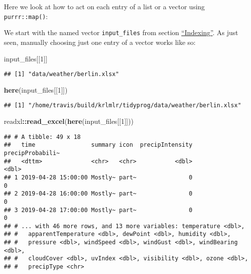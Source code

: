 \documentclass[]{book}
\newenvironment{Shaded}{\begin{snugshade}}{\end{snugshade}}
\newcommand{\DecValTok}[1]{\textcolor[rgb]{0.00,0.00,0.81}{#1}}
\newcommand{\KeywordTok}[1]{\textcolor[rgb]{0.13,0.29,0.53}{\textbf{#1}}}
\newcommand{\NormalTok}[1]{#1}
\newcommand{\OperatorTok}[1]{\textcolor[rgb]{0.81,0.36,0.00}{\textbf{#1}}}
\begin{document}
Here we look at how to act on each entry of a list or a vector using \texttt{purrr::map()}:

We start with the named vector \texttt{input\_files} from section \protect\hyperlink{indexing}{``Indexing''}.
As just seen, manually choosing just one entry of a vector works like so:

\begin{Shaded}
\begin{Highlighting}[]
\NormalTok{input_files[[}\DecValTok{1}\NormalTok{]]}
\end{Highlighting}
\end{Shaded}

\begin{verbatim}
## [1] "data/weather/berlin.xlsx"
\end{verbatim}

\begin{Shaded}
\begin{Highlighting}[]
\KeywordTok{here}\NormalTok{(input_files[[}\DecValTok{1}\NormalTok{]])}
\end{Highlighting}
\end{Shaded}

\begin{verbatim}
## [1] "/home/travis/build/krlmlr/tidyprog/data/weather/berlin.xlsx"
\end{verbatim}

\begin{Shaded}
\begin{Highlighting}[]
\NormalTok{readxl}\OperatorTok{::}\KeywordTok{read_excel}\NormalTok{(}\KeywordTok{here}\NormalTok{(input_files[[}\DecValTok{1}\NormalTok{]]))}
\end{Highlighting}
\end{Shaded}

\begin{verbatim}
## # A tibble: 49 x 18
##   time                summary icon  precipIntensity precipProbabili~
##   <dttm>              <chr>   <chr>           <dbl>            <dbl>
## 1 2019-04-28 15:00:00 Mostly~ part~               0                0
## 2 2019-04-28 16:00:00 Mostly~ part~               0                0
## 3 2019-04-28 17:00:00 Mostly~ part~               0                0
## # ... with 46 more rows, and 13 more variables: temperature <dbl>,
## #   apparentTemperature <dbl>, dewPoint <dbl>, humidity <dbl>,
## #   pressure <dbl>, windSpeed <dbl>, windGust <dbl>, windBearing <dbl>,
## #   cloudCover <dbl>, uvIndex <dbl>, visibility <dbl>, ozone <dbl>,
## #   precipType <chr>
\end{verbatim}
\end{document}
